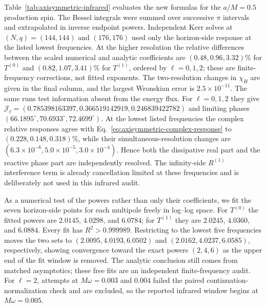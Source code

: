 \documentclass[aps,prd,twocolumn,10pt,nofootinbib,superscriptaddress,floatfix]{revtex4-2}
\begin{document}
Table~\ref{tab:axisymmetric-infrared} evaluates the new formulas for the
$a/M=0.5$ production spin.  The Bessel integrals were summed over successive
$\pi$ intervals and extrapolated in inverse endpoint powers.  Independent
Kerr solves at $(N,q)=(144,144)$ and $(176,176)$ used only the horizon-side
response at the listed lowest frequencies.  At the higher resolution the
relative differences between the scaled numerical and analytic coefficients
are $(0.48,0.96,3.32)\%$ for $T^{(0)}$ and $(0.82,1.07,3.41)\%$ for
$T^{(1)}$, ordered by $\ell=0,1,2$; these are finite-frequency corrections,
not fitted exponents.  The two-resolution changes in $\chi_H$ are given in
the final column, and the largest Wronskian error is $2.5\times10^{-11}$.
The same runs test information absent from the energy flux.  For
$\ell=0,1,2$ they give
$\mathcal J_\ell=(0.785398163397,0.366519142919,0.246839422782)$ and limiting
phases $(66.1895^\circ,70.6933^\circ,72.4699^\circ)$.  At the lowest listed
frequencies the complex relative responses agree with
Eq.~\eqref{eq:axisymmetric-complex-response} to
$(0.228,0.148,0.318)\%$, while their simultaneous-resolution changes are
$(6.3\times10^{-6},5.0\times10^{-5},3.0\times10^{-4})$.  Hence both the
dissipative real part and the reactive phase part are independently resolved.
The infinity-side $R^{(1)}$ interference term is already cancellation limited
at these frequencies and is deliberately not used in this infrared audit.

As a numerical test of the powers rather than only their coefficients, we fit
the seven horizon-side points for each multipole freely in log--log space.
For $T^{(0)}$ the fitted powers are $2.0145$, $4.0298$, and $6.0784$; for
$T^{(1)}$ they are $2.0245$, $4.0360$, and $6.0884$.  Every fit has
$R^2>0.999989$.  Restricting to the lowest five frequencies moves the two
sets to $(2.0095,4.0193,6.0502)$ and $(2.0162,4.0237,6.0585)$,
respectively, showing convergence toward the exact powers $(2,4,6)$ as the
upper end of the fit window is removed.  The analytic conclusion still comes
from matched asymptotics; these free fits are an independent finite-frequency
audit.  For $\ell=2$, attempts at $M\omega=0.003$ and $0.004$ failed the
paired continuation-normalization check and are excluded, so the reported
infrared window begins at $M\omega=0.005$.
\end{document}
